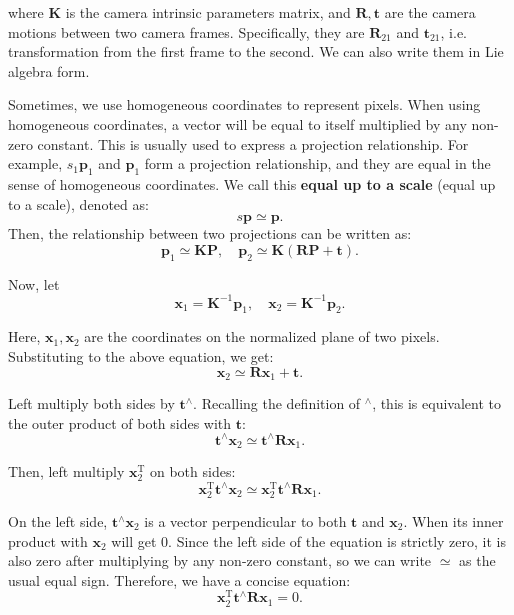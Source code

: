 where $\bm{K}$ is the camera intrinsic parameters matrix, and $\bm{R}, \bm{t}$ are the camera motions between two camera frames. Specifically, they are $\bm{R}_{21}$ and $\bm{t}_{21}$, i.e. transformation from the first frame to the second. We can also write them in Lie algebra form.

Sometimes, we use homogeneous coordinates to represent pixels. When using homogeneous coordinates, a vector will be equal to itself multiplied by any non-zero constant. This is usually used to express a projection relationship. For example, $s_1 \bm{p}_1$ and $\bm{p}_1$ form a projection relationship, and they are equal in the sense of homogeneous coordinates. We call this \textbf{equal up to a scale} (equal up to a scale), denoted as:
\begin{equation}
s\bm{p} \simeq \bm{p}.
\end{equation}
Then, the relationship between two projections can be written as:
\begin{equation}
 {\bm{p}_1} \simeq \bm{KP},\quad \bm{p}_2 \simeq \bm{K}\left( \bm{RP + t} \right).
\end{equation}

Now, let
\begin{equation}
{\bm{x}_1} = {\bm{K}^{ - 1}}{\bm{p}_1}, \quad {\bm{x}_2} = {\bm{K}^{ - 1}}{\bm{p}_2}.
\end{equation}

Here, $\bm{x}_1, \bm{x}_2$ are the coordinates on the normalized plane of two pixels. Substituting to the above equation, we get:
\begin{equation}
{\bm{x}_2} \simeq \bm{R} {\bm{x}_1} + \bm{t}.
\end{equation}

Left multiply both sides by $\bm{t}^\wedge$. Recalling the definition of $^\wedge$, this is equivalent to the outer product of both sides with $\bm{t}$:
\begin{equation}
\bm{t}^\wedge \bm{x}_2 \simeq \bm{t}^\wedge \bm{R} \bm{x}_1.
\end{equation}

Then, left multiply $\bm{x}_2^\mathrm{T}$ on both sides:
\begin{equation}
\bm{x}_2^\mathrm{T} \bm{t}^\wedge \bm{x}_2 \simeq \bm{x}_2^\mathrm{T} \bm{t}^\wedge \bm{R} \bm{x}_1.
\end{equation}

On the left side, $\bm{t}^\wedge \bm{x}_2$ is a vector perpendicular to both $\bm{t}$ and $\bm{x}_2$. When its inner product with $\bm{x}_2$ will get 0. Since the left side of the equation is strictly zero, it is also zero after multiplying by any non-zero constant, so we can write $\simeq$ as the usual equal sign. Therefore, we have a concise equation:
\begin{equation}
 \bm{x}_2^\mathrm{T} \bm{t}^\wedge \bm{R} \bm{x}_1 = 0.
\end{equation}

